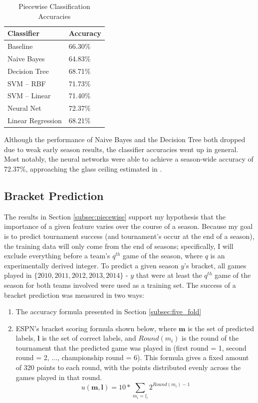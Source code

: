 \documentclass[]{article}
\begin{document}
\begin{table}[ht]
\centering
\begin{tabular}{@{}ll@{}}
\toprule
Classifier        & Accuracy \\ \midrule
Baseline          & 66.30\%  \\
Naive Bayes       & 64.83\%  \\
Decision Tree     & 68.71\%  \\
SVM -- RBF        & 71.73\%  \\
SVM -- Linear     & 71.40\%  \\
Neural Net        & 72.37\%  \\
Linear Regression & 68.21\%  \\ \bottomrule
\end{tabular}
\caption{Piecewise Classification Accuracies}
\label{table:piecewise_classification}
\end{table}

Although the performance of Naive Bayes and the Decision Tree both dropped due to weak early season results, the classifier accuracies went up in general. Most notably, the neural networks were able to achieve a season-wide accuracy of 72.37\%, approaching the glass ceiling estimated in \cite{ncaaml}.

\subsection{Bracket Prediction}

The results in Section \ref{subsec:piecewise} support my hypothesis that the importance of a given feature varies over the course of a season. Because my goal is to predict tournament success (and tournament's occur at the end of a season), the training data will only come from the end of seasons; specifically, I will exclude everything before a team's $q^{th}$ game of the season, where $q$ is an experimentally derived integer. To predict a given season $y$'s bracket, all games played in $\{2010, 2011, 2012, 2013, 2014\}$ - $y$ that were at least the $q^{th}$ game of the season for both teams involved were used as a training set. The success of a bracket prediction was measured in two ways:
\begin{enumerate}
	\item The accuracy formula presented in Section \ref{subsec:five_fold}
	\item ESPN's bracket scoring formula shown below, where $\mathbf{m}$ is the set of predicted labels, $\mathbf{l}$ is the set of correct labels, and $Round(m_i)$ is the round of the tournament that the predicted game was played in (first round = 1, second round = 2, ..., championship round = 6). This formula gives a fixed amount of 320 points to each round, with the points distributed evenly across the games played in that round.
	\begin{equation}
		u(\mathbf{m}, \mathbf{l}) = 10*\sum_{m_i=l_i}2^{Round(m_i) - 1}
	\end{equation}
\end{enumerate}
\end{document}
